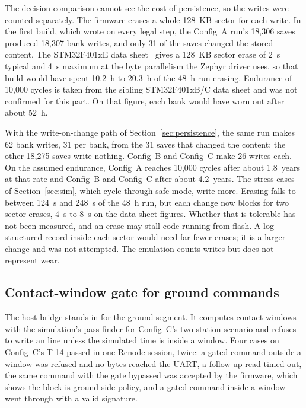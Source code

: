 \documentclass[preprint,12pt]{elsarticle}
\newcommand{\cfgA}{Config~A}
\newcommand{\cfgB}{Config~B}
\newcommand{\cfgC}{Config~C}
\begin{document}
The decision comparison cannot see the cost of persistence, so the writes were counted separately. The firmware erases a whole 128~KB sector for each write. In the first build, which wrote on every legal step, the \cfgA{} run's 18,306 saves produced 18,307 bank writes, and only 31 of the saves changed the stored content. The STM32F401xE data sheet~\cite{STM32F401xE} gives a 128~KB sector erase of 2~s typical and 4~s maximum at the byte parallelism the Zephyr driver uses, so that build would have spent 10.2~h to 20.3~h of the 48~h run erasing. Endurance of 10,000 cycles is taken from the sibling STM32F401xB/C data sheet and was not confirmed for this part. On that figure, each bank would have worn out after about 52~h.

With the write-on-change path of Section~\ref{sec:persistence}, the same run makes 62 bank writes, 31 per bank, from the 31 saves that changed the content; the other 18,275 saves write nothing. \cfgB{} and \cfgC{} make 26 writes each. On the assumed endurance, \cfgA{} reaches 10,000 cycles after about 1.8~years at that rate and \cfgB{} and \cfgC{} after about 4.2~years. The stress cases of Section~\ref{sec:sim}, which cycle through safe mode, write more. Erasing falls to between 124~s and 248~s of the 48~h run, but each change now blocks for two sector erases, 4~s to 8~s on the data-sheet figures. Whether that is tolerable has not been measured, and an erase may stall code running from flash. A log-structured record inside each sector would need far fewer erases; it is a larger change and was not attempted. The emulation counts writes but does not represent wear.


\subsection{Contact-window gate for ground commands}

The host bridge stands in for the ground segment. It computes contact windows with the simulation's pass finder for \cfgC{}'s two-station scenario and refuses to write an  line unless the simulated time is inside a window. Four cases on \cfgC{}'s T-14 passed in one Renode session, twice: a gated command outside a window was refused and no bytes reached the UART, a follow-up read timed out, the same command with the gate bypassed was accepted by the firmware, which shows the block is ground-side policy, and a gated command inside a window went through with a valid signature.

\end{document}
